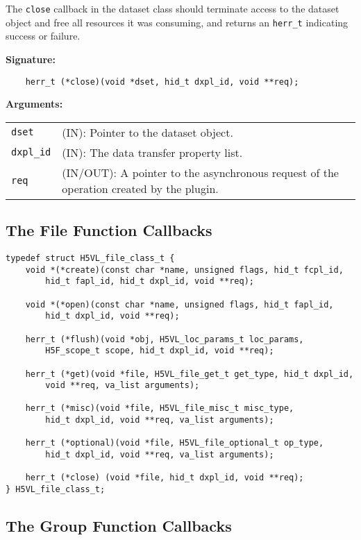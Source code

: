 The {\tt close} callback in the dataset class should terminate access
to the dataset object and free all resources it was consuming, and
returns an {\tt herr\_t} indicating success or failure.

\textbf{Signature:}
\begin{lstlisting}
    herr_t (*close)(void *dset, hid_t dxpl_id, void **req);
\end{lstlisting}

\textbf{Arguments:}\\
\begin{tabular}{l p{10cm}}
  {\tt dset} & (IN): Pointer to the dataset object.\\
  {\tt dxpl\_id} & (IN): The data transfer property list.\\
  {\tt req} & (IN/OUT): A pointer to the asynchronous request of the
  operation created by the plugin.\\
\end{tabular}

\subsection{The File Function Callbacks}

\begin{lstlisting}
typedef struct H5VL_file_class_t {
    void *(*create)(const char *name, unsigned flags, hid_t fcpl_id,
        hid_t fapl_id, hid_t dxpl_id, void **req);

    void *(*open)(const char *name, unsigned flags, hid_t fapl_id, 
        hid_t dxpl_id, void **req);

    herr_t (*flush)(void *obj, H5VL_loc_params_t loc_params, 
        H5F_scope_t scope, hid_t dxpl_id, void **req);

    herr_t (*get)(void *file, H5VL_file_get_t get_type, hid_t dxpl_id, 
        void **req, va_list arguments);

    herr_t (*misc)(void *file, H5VL_file_misc_t misc_type, 
        hid_t dxpl_id, void **req, va_list arguments);

    herr_t (*optional)(void *file, H5VL_file_optional_t op_type, 
        hid_t dxpl_id, void **req, va_list arguments);

    herr_t (*close) (void *file, hid_t dxpl_id, void **req);
} H5VL_file_class_t;
\end{lstlisting}

\subsection{The Group Function Callbacks}

